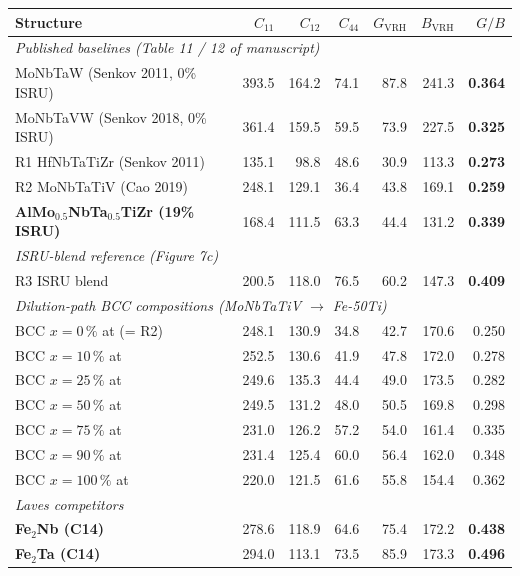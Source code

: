 \documentclass[11pt,a4paper]{article}
\begin{document}
\begin{center}
{\small\setlength{\tabcolsep}{4pt}
\begin{tabular}{lrrrrrr}
\toprule
\textbf{Structure} & $C_{11}$ & $C_{12}$ & $C_{44}$ & $G_{\text{VRH}}$ & $B_{\text{VRH}}$ & \textbf{$G/B$}\\
\midrule
\multicolumn{7}{l}{\textit{Published baselines (Table 11 / 12 of manuscript)}}\\
MoNbTaW (Senkov 2011, 0\% ISRU)    & 393.5 & 164.2 & 74.1 & 87.8 & 241.3 & \textbf{0.364}\\
MoNbTaVW (Senkov 2018, 0\% ISRU)   & 361.4 & 159.5 & 59.5 & 73.9 & 227.5 & \textbf{0.325}\\
R1 HfNbTaTiZr (Senkov 2011)        & 135.1 & 98.8  & 48.6 & 30.9 & 113.3 & \textbf{0.273}\\
R2 MoNbTaTiV (Cao 2019)            & 248.1 & 129.1 & 36.4 & 43.8 & 169.1 & \textbf{0.259}\\
\rowcolor{soft}\textbf{AlMo$_{0.5}$NbTa$_{0.5}$TiZr (19\% ISRU)} & 168.4 & 111.5 & 63.3 & 44.4 & 131.2 & \textbf{0.339}\\
\midrule
\multicolumn{7}{l}{\textit{ISRU-blend reference (Figure 7c)}}\\
R3 ISRU blend                      & 200.5 & 118.0 & 76.5 & 60.2 & 147.3 & \textbf{0.409}\\
\midrule
\multicolumn{7}{l}{\textit{Dilution-path BCC compositions (MoNbTaTiV $\rightarrow$ Fe-50Ti)}}\\
BCC $x=0\,\%$ at (= R2)            & 248.1 & 130.9 & 34.8 & 42.7 & 170.6 & 0.250\\
BCC $x=10\,\%$ at                  & 252.5 & 130.6 & 41.9 & 47.8 & 172.0 & 0.278\\
BCC $x=25\,\%$ at                  & 249.6 & 135.3 & 44.4 & 49.0 & 173.5 & 0.282\\
BCC $x=50\,\%$ at                  & 249.5 & 131.2 & 48.0 & 50.5 & 169.8 & 0.298\\
BCC $x=75\,\%$ at                  & 231.0 & 126.2 & 57.2 & 54.0 & 161.4 & 0.335\\
BCC $x=90\,\%$ at                  & 231.4 & 125.4 & 60.0 & 56.4 & 162.0 & 0.348\\
BCC $x=100\,\%$ at                 & 220.0 & 121.5 & 61.6 & 55.8 & 154.4 & 0.362\\
\midrule
\multicolumn{7}{l}{\textit{Laves competitors}}\\
\rowcolor{warn!10}\textbf{Fe$_2$Nb (C14)} & 278.6 & 118.9 & 64.6 & 75.4 & 172.2 & \textbf{0.438}\\
\rowcolor{warn!10}\textbf{Fe$_2$Ta (C14)} & 294.0 & 113.1 & 73.5 & 85.9 & 173.3 & \textbf{0.496}\\
\bottomrule
\end{tabular}}
\end{center}
\end{document}
